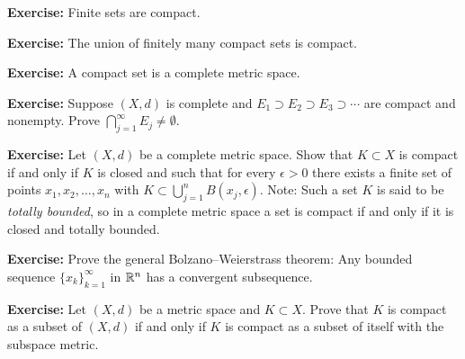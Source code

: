 \documentclass[10pt,aspectratio=169]{beamer}
\begin{document}
\begin{frame}

\textbf{Exercise:}
Finite sets are compact.

\pause
\medskip

\textbf{Exercise:}
The union of finitely many compact sets is compact.

\pause
\medskip

\textbf{Exercise:}
A compact set is a complete metric space.

\pause
\medskip

\textbf{Exercise:}
Suppose $(X,d)$ is complete and
$E_1 \supset E_2 \supset E_3 \supset \cdots$ are compact and nonempty.
Prove $\bigcap_{j=1}^\infty E_j \not= \emptyset$.

\medskip
\pause

\textbf{Exercise:}
Let $(X,d)$ be a complete metric space.
Show that $K \subset X$ is compact if and only if $K$ is closed
and such that for every $\epsilon > 0$
there exists a finite set of points $x_1,x_2,\ldots,x_n$ with
$K \subset \bigcup_{j=1}^n B(x_j,\epsilon)$.
\pause
Note: Such a set $K$ is said to be \emph{totally bounded},
so in a complete metric space a set is compact if and only
if it is closed and totally bounded.

\pause
\medskip

\textbf{Exercise:}
Prove the general Bolzano--Weierstrass theorem:
Any bounded sequence $\{ x_k \}_{k=1}^\infty$ in ${\mathbb{R}}^n$
has a convergent subsequence.

\pause
\medskip

\textbf{Exercise:}
Let $(X,d)$ be a metric space and $K \subset X$.
Prove that $K$ is compact as a subset of $(X,d)$ if and only if $K$ is
compact as a subset of itself with the subspace metric.

\end{frame}
\end{document}
